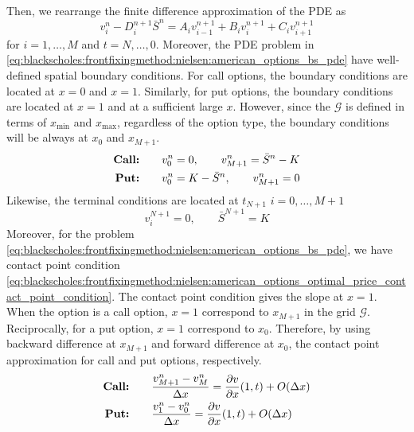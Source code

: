 Then, we rearrange the finite difference approximation of the PDE as 
\begin{equation}
  v^{n}_{i} - D^{n+1}_{i}\bar{S}^n = A_i v^{n+1}_{i-1} + B_{i}v^{n+1}_{i} + C_{i}v^{n+1}_{i+1}
  \label{eq:finitedifferencesschemes:explicit:pde_simplified}
\end{equation}
for $i = 1, \dots, M$ and $t = N, \dots, 0$. Moreover, the PDE problem in \eqref{eq:blackscholes:frontfixingmethod:nielsen:american_options_bs_pde} have well-defined spatial boundary conditions. For call options, the boundary conditions are located at $x=0$ and $x=1$. Similarly, for put options, the boundary conditions are located at $x=1$ and at a sufficient large $x$. However, since the $\mathcal{G}$ is defined in terms of $x_\text{min}$ and $x_\text{max}$, regardless of the option type, the boundary conditions will be always at $x_0$ and $x_{M+1}$.
\begin{subequations}
  \label{eq:finitedifferencesschemes:explicit:boundary_conditions}
  \begin{align}
    \text{\textbf{Call:}} \qquad & v^{n}_{0} = 0, \qquad v^{n}_{M+1} = \bar{S}^{n} - K\\
    \text{\textbf{Put:}} \qquad & v^{n}_{0} = K - \bar{S}^{n}, \qquad v^{n}_{M+1} = 0
  \end{align}
\end{subequations}
Likewise, the terminal conditions are located at $t_{N+1}$ $i=0,\dots,M+1$
\begin{subequations}
  \label{eq:finitedifferencesschemes:explicit:terminal_conditions}
  \begin{equation}
    v^{N+1}_{i} = 0, \qquad \bar{S}^{N+1} = K
  \end{equation}
\end{subequations}
Moreover, for the problem \eqref{eq:blackscholes:frontfixingmethod:nielsen:american_options_bs_pde}, we have contact point condition \eqref{eq:blackscholes:frontfixingmethod:nielsen:american_options_optimal_price_contact_point_condition}. The contact point condition gives the slope at $x=1$. When the option is a call option, $x=1$ correspond to $x_{M+1}$ in the grid $\mathcal{G}$. Reciprocally, for a put option, $x=1$ correspond to $x_0$. Therefore, by using backward difference at $x_{M+1}$ and forward difference at $x_0$, the contact point approximation for call and put options, respectively.
\begin{align*}
  \text{\textbf{Call:}} \qquad & \dfrac{v^{n}_{M+1} - v^{n}_{M}}{\Delta{x}} = \dfrac{\partial{v}}{\partial{x}}(1, t) + O(\Delta{x}) \\
  \text{\textbf{Put:}} \qquad & \dfrac{v^{n}_{1} - v^{n}_{0}}{\Delta{x}} = \dfrac{\partial{v}}{\partial{x}}(1, t)+ O(\Delta{x}) 
\end{align*}
